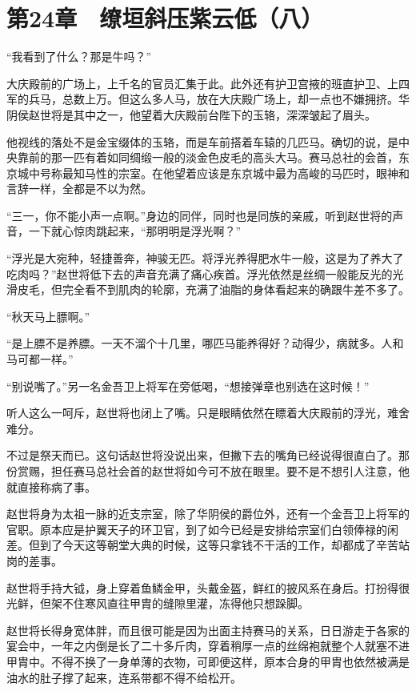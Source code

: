 \section{第24章　缭垣斜压紫云低（八）}

“我看到了什么？那是牛吗？”

大庆殿前的广场上，上千名的官员汇集于此。此外还有护卫宫掖的班直护卫、上四军的兵马，总数上万。但这么多人马，放在大庆殿广场上，却一点也不嫌拥挤。华阴侯赵世将是其中之一，他望着大庆殿前台陛下的玉辂，深深皱起了眉头。

他视线的落处不是金宝缀体的玉辂，而是车前搭着车辕的几匹马。确切的说，是中央靠前的那一匹有着如同绸缎一般的淡金色皮毛的高头大马。赛马总社的会首，东京城中号称最知马性的宗室。在他望着应该是东京城中最为高峻的马匹时，眼神和言辞一样，全都是不以为然。

“三一，你不能小声一点啊。”身边的同伴，同时也是同族的亲戚，听到赵世将的声音，一下就心惊肉跳起来，“那明明是浮光啊？”

“浮光是大宛种，轻捷善奔，神骏无匹。将浮光养得肥水牛一般，这是为了养大了吃肉吗？”赵世将低下去的声音充满了痛心疾首。浮光依然是丝绸一般能反光的光滑皮毛，但完全看不到肌肉的轮廓，充满了油脂的身体看起来的确跟牛差不多了。

“秋天马上膘啊。”

“是上膘不是养膘。一天不溜个十几里，哪匹马能养得好？动得少，病就多。人和马可都一样。”

“别说嘴了。”另一名金吾卫上将军在旁低喝，“想接弹章也别选在这时候！”

听人这么一呵斥，赵世将也闭上了嘴。只是眼睛依然在瞟着大庆殿前的浮光，难舍难分。

不过是祭天而已。这句话赵世将没说出来，但撇下去的嘴角已经说得很直白了。那份赏赐，担任赛马总社会首的赵世将如今可不放在眼里。要不是不想引人注意，他就直接称病了事。

赵世将身为太祖一脉的近支宗室，除了华阴侯的爵位外，还有一个金吾卫上将军的官职。原本应是护翼天子的环卫官，到了如今已经是安排给宗室们白领俸禄的闲差。但到了今天这等朝堂大典的时候，这等只拿钱不干活的工作，却都成了辛苦站岗的差事。

赵世将手持大钺，身上穿着鱼鳞金甲，头戴金盔，鲜红的披风系在身后。打扮得很光鲜，但架不住寒风直往甲胄的缝隙里灌，冻得他只想跺脚。

赵世将长得身宽体胖，而且很可能是因为出面主持赛马的关系，日日游走于各家的宴会中，一年之内倒是长了二十多斤肉，穿着稍厚一点的丝绵袍就整个人就塞不进甲胄中。不得不换了一身单薄的衣物，可即便这样，原本合身的甲胄也依然被满是油水的肚子撑了起来，连系带都不得不给松开。

